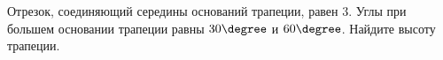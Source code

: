 \begin{ex}
	\begin{condition}
		Отрезок, соединяющий середины оснований трапеции, равен \( 3 \). Углы при большем основании трапеции равны \( 30\degree \) и \( 60\degree \). Найдите высоту трапеции.
	\end{condition}
\end{ex}